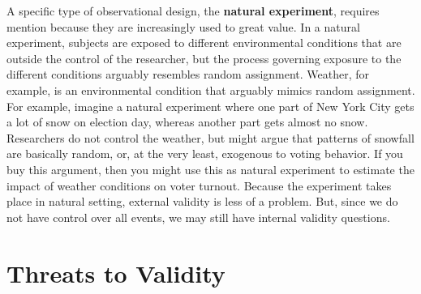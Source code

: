 \documentclass[11pt,openany]{book}\usepackage[]{graphicx}\usepackage[]{color}
\begin{document}
A specific type of observational design, the \textbf{natural experiment}, requires mention because they are increasingly used to great value. In a natural experiment, subjects are exposed to different environmental conditions that are outside the control of the researcher, but the process governing exposure to the different conditions arguably resembles random assignment. Weather, for example, is an environmental condition that arguably mimics random assignment. For example, imagine a natural experiment where one part of New York City gets a lot of snow on election day, whereas another part gets almost no snow. Researchers do not control the weather, but might argue that patterns of snowfall are basically random, or, at the very least, exogenous to voting behavior. If you buy this argument, then you might use this as natural experiment to estimate the impact of weather conditions on voter turnout. Because the experiment takes place in natural setting, external validity is less of a problem. But, since we do not have control over all events, we may still have internal validity questions.

\section{Threats to Validity}
\end{document}
